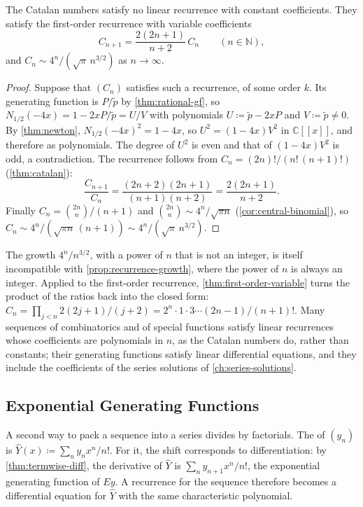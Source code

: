 \begin{proposition}
\label{prop:catalan-no-recurrence}
The Catalan numbers satisfy no linear recurrence with constant coefficients. They satisfy the first-order recurrence with variable coefficients
\[
C_{n+1}=\frac{2(2n+1)}{n+2}\,C_n\qquad(n\in\mathbb N),
\]
and $C_n\sim4^n/(\sqrt\pi\,n^{3/2})$ as $n\to\infty$.
\end{proposition}

\begin{proof}
Suppose that $(C_n)$ satisfies such a recurrence, of some order $k$. Its generating function is $P/\tilde p$ by \cref{thm:rational-gf}, so $N_{1/2}(-4x)=1-2xP/\tilde p=U/V$ with polynomials $U\coloneqq\tilde p-2xP$ and $V\coloneqq\tilde p\ne0$. By \cref{thm:newton}, $N_{1/2}(-4x)^2=1-4x$, so $U^2=(1-4x)V^2$ in $\mathbb C[[x]]$, and therefore as polynomials. The degree of $U^2$ is even and that of $(1-4x)V^2$ is odd, a contradiction. The recurrence follows from $C_n=(2n)!/(n!\,(n+1)!)$ (\cref{thm:catalan}):
\[
\frac{C_{n+1}}{C_n}=\frac{(2n+2)(2n+1)}{(n+1)(n+2)}=\frac{2(2n+1)}{n+2} .
\]
Finally $C_n=\binom{2n}n/(n+1)$ and $\binom{2n}n\sim4^n/\sqrt{\pi n}$ (\cref{cor:central-binomial}), so $C_n\sim4^n/(\sqrt{\pi n}\,(n+1))\sim4^n/(\sqrt\pi\,n^{3/2})$.
\end{proof}

The growth $4^n/n^{3/2}$, with a power of $n$ that is not an integer, is itself incompatible with \cref{prop:recurrence-growth}, where the power of $n$ is always an integer. Applied to the first-order recurrence, \cref{thm:first-order-variable} turns the product of the ratios back into the closed form: $C_n=\prod_{j<n}2(2j+1)/(j+2)=2^n\cdot1\cdot3\cdots(2n-1)/(n+1)!$. Many sequences of combinatorics and of special functions satisfy linear recurrences whose coefficients are polynomials in $n$, as the Catalan numbers do, rather than constants; their generating functions satisfy linear differential equations, and they include the coefficients of the series solutions of \cref{ch:series-solutions}.

\subsection{Exponential Generating Functions}

A second way to pack a sequence into a series divides by factorials. The  of $(y_n)$ is $\hat Y(x)\coloneqq\sum_ny_nx^n/n!$. For it, the shift corresponds to differentiation: by \cref{thm:termwise-diff}, the derivative of $\hat Y$ is $\sum_ny_{n+1}x^n/n!$, the exponential generating function of $Ey$. A recurrence for the sequence therefore becomes a differential equation for $\hat Y$ with the same characteristic polynomial.

